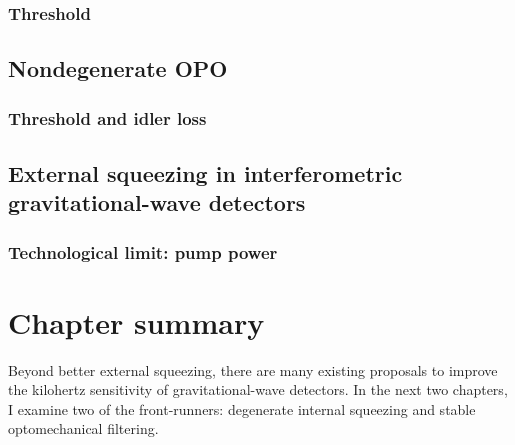 
\subsubsection{Threshold}


\subsection{Nondegenerate OPO}


\subsubsection{Threshold and idler loss}


\subsection{External squeezing in interferometric gravitational-wave detectors}


\subsubsection{Technological limit: pump power} 

\section{Chapter summary}

Beyond better external squeezing, there are many  existing proposals to improve the kilohertz sensitivity of gravitational-wave detectors. In the next two chapters, I examine two of the front-runners: degenerate internal squeezing and stable optomechanical filtering.

